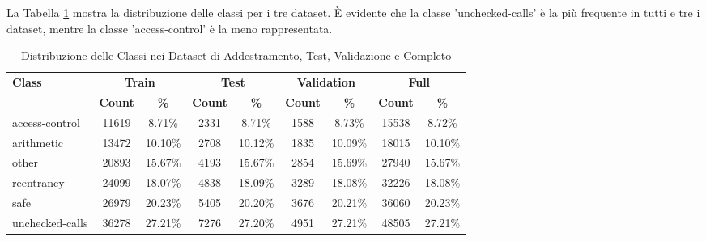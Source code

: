 \documentclass[../../Thesis.tex]{subfiles}
\begin{document}
La Tabella \ref{tab:class_distribution} mostra la distribuzione delle classi per i tre dataset. È evidente che la classe 'unchecked-calls' è la più frequente in tutti e tre i dataset, mentre la classe 'access-control' è la meno rappresentata.
\begin{table}[h!]
    \centering
    \begin{tabular}{|l|c|c|c|c|c|c|c|c|}
        \hline
        \textbf{Class} & \multicolumn{2}{|c|}{\textbf{Train}} & \multicolumn{2}{|c|}{\textbf{Test}} & \multicolumn{2}{|c|}{\textbf{Validation}} & \multicolumn{2}{|c|}{\textbf{Full}} \\
        \cline{2-9}
        & \textbf{Count} & \textbf{\%} & \textbf{Count} & \textbf{\%} & \textbf{Count} & \textbf{\%} & \textbf{Count} & \textbf{\%} \\
        \hline
        access-control & 11619 & 8.71\% & 2331 & 8.71\% & 1588 & 8.73\% & 15538 & 8.72\% \\
        arithmetic & 13472 & 10.10\% & 2708 & 10.12\% & 1835 & 10.09\% & 18015 & 10.10\% \\
        other & 20893 & 15.67\% & 4193 & 15.67\% & 2854 & 15.69\% & 27940 & 15.67\% \\
        reentrancy & 24099 & 18.07\% & 4838 & 18.09\% & 3289 & 18.08\% & 32226 & 18.08\% \\
        safe & 26979 & 20.23\% & 5405 & 20.20\% & 3676 & 20.21\% & 36060 & 20.23\% \\
        unchecked-calls & 36278 & 27.21\% & 7276 & 27.20\% & 4951 & 27.21\% & 48505 & 27.21\% \\
        \hline
    \end{tabular}
    \caption{Distribuzione delle Classi nei Dataset di Addestramento, Test, Validazione e Completo}
    \label{tab:class_distribution}
\end{table}
\end{document}
